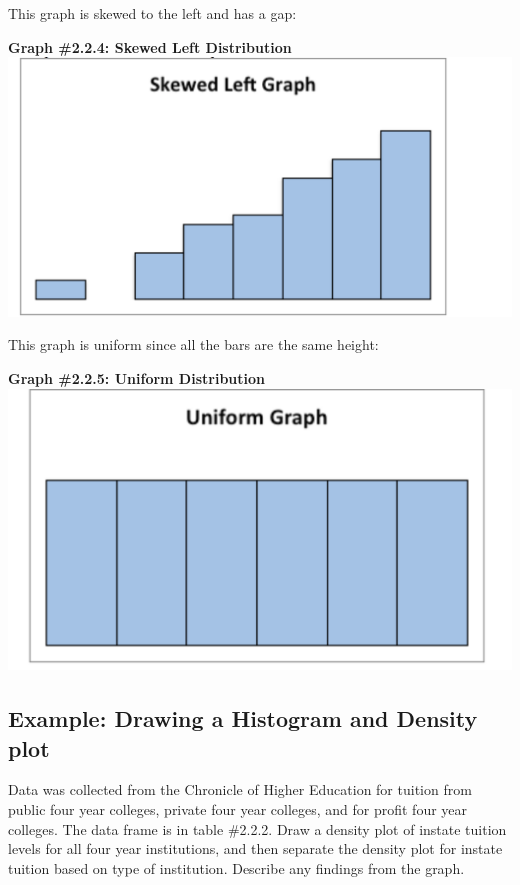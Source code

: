 \documentclass[
]{book}
\begin{document}
This graph is skewed to the left and has a gap:

\textbf{Graph \#2.2.4: Skewed Left Distribution}
\includegraphics{skewed_left.png}

This graph is uniform since all the bars are the same height:

\textbf{Graph \#2.2.5: Uniform Distribution}
\includegraphics{uniform.png}

\hypertarget{example-drawing-a-histogram-and-density-plot-1}{%
\subsection{Example: Drawing a Histogram and Density plot}\label{example-drawing-a-histogram-and-density-plot-1}}

Data was collected from the Chronicle of Higher Education for tuition from public four year colleges, private four year colleges, and for profit four year colleges. The data frame is in table \#2.2.2. Draw a density plot of instate tuition levels for all four year institutions, and then separate the density plot for instate tuition based on type of institution. Describe any findings from the graph.
\end{document}
